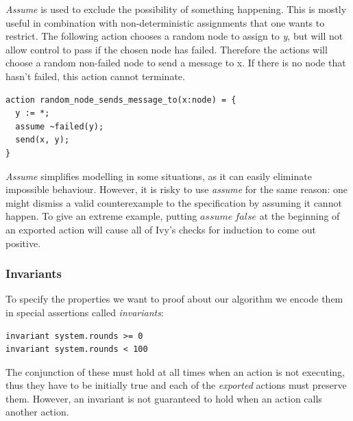 \documentclass[fleqn]{article}
\begin{document}
\textit{Assume} is used to exclude the possibility of something happening.  This is mostly useful in combination with non-deterministic assignments that one wants to restrict. The following action chooses a random node to assign to \textit{y}, but will not allow control to pass if the chosen node has failed. Therefore the actions will choose a random non-failed node to send a message to x.  If there is no node that hasn't failed, this action cannot terminate.

\begin{mdframed}[backgroundcolor=light-gray, roundcorner=10pt,leftmargin=1, rightmargin=1, innerleftmargin=15, innertopmargin=15,innerbottommargin=15, outerlinewidth=1, linecolor=light-gray]
\begin{lstlisting}
action random_node_sends_message_to(x:node) = {
  y := *;
  assume ~failed(y);
  send(x, y);
}
\end{lstlisting}
\end{mdframed}

\textit{Assume} simplifies modelling in some situations, as it can easily eliminate impossible behaviour. However,
it is risky to use \textit{assume} for the same reason: one might dismiss a valid counterexample to the specification
by assuming it cannot happen. To give an extreme example, putting $assume\ false$ at the beginning of an exported action will cause all of Ivy's checks for induction to come out positive.


\subsubsection{Invariants}
To specify the properties we want to proof about our algorithm we encode them in special assertions called \textit{invariants}:

\begin{mdframed}[backgroundcolor=light-gray, roundcorner=10pt,leftmargin=1, rightmargin=1, innerleftmargin=15, innertopmargin=15,innerbottommargin=15, outerlinewidth=1, linecolor=light-gray]
\begin{lstlisting}
invariant system.rounds >= 0
invariant system.rounds < 100
\end{lstlisting}
\end{mdframed}
The conjunction of these must hold at all times when an action is not executing, thus they have to be initially true and each of
the \textit{exported} actions must preserve them. However, an invariant is not guaranteed to hold when an action calls another action.
\end{document}
